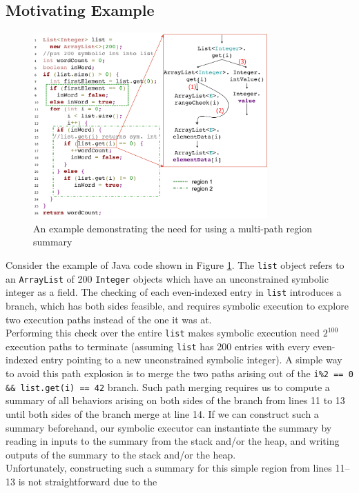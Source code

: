 \subsection{Motivating Example}
\begin{figure}
    \includegraphics[width=0.8\textwidth]{figures/wordCount.pdf}
    \caption{An example demonstrating the need for using a multi-path region summary}
    \label{fig:mot-example}
\end{figure}
Consider the example of Java code shown in Figure \ref{fig:mot-example}.
%
The {\tt list} object refers to an {\tt ArrayList} of 200 {\tt Integer} objects which have an unconstrained symbolic
integer as a field.
%
The checking of each even-indexed entry in {\tt list} introduces a branch, which has both sides feasible, and requires
symbolic execution to explore two execution paths instead of the one it was at.\\
%
Performing this check over the entire {\tt list} makes symbolic execution need $2^{100}$ execution paths to terminate
(assuming {\tt list} has 200 entries with every even-indexed entry pointing to a new unconstrained symbolic integer).
%
A simple way to avoid this path explosion is to merge the two paths arising out of the {\tt i\%2 == 0 \&\& list.get(i) == 42} branch.
%
Such path merging requires us to compute a summary of all behaviors arising on both sides of the branch from lines 11 to 13
until both sides of the branch merge at line 14.
%
If we can construct such a summary beforehand, our symbolic executor can instantiate the summary by reading in inputs to
the summary from the stack and/or the heap, and writing outputs of the summary to the stack and/or the heap.\\
%
Unfortunately, constructing such a summary for this simple region from lines 11--13 is not straightforward due to the
